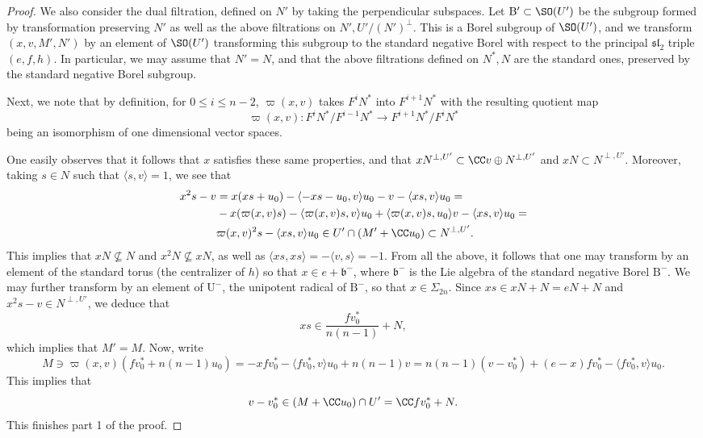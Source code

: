 \documentclass[11pt]{article}
\begin{document}
\begin{proof}
    We also consider the dual filtration, defined on $N'$ by taking the perpendicular subspaces.
    Let $\mathrm{B}'\subset \SO(U')$ be the subgroup formed by transformation preserving $N'$ as well as the above filtrations on $N', U' / (N')^\perp$. This is a Borel subgroup of $\SO(U')$, and we transform $(x, v, M', N')$ by an element of $\SO(U')$ transforming this subgroup to the standard negative Borel with respect to the principal $\mathfrak{sl}_2$ triple $(e,f,h)$.
    In particular, we may assume that $N' = N$, and that the above filtrations defined on $N^*, N$ are the standard ones, preserved by the standard negative Borel subgroup.

    Next, we note that by definition, for $0\leq i \leq n-2$, $\varpi(x, v)$ takes $F^iN^*$ into $F^{i+1}N^*$ with the resulting quotient map $$\varpi(x,v): F^iN^*/F^{i-1}N^*\to F^{i+1}N^*/F^iN^*$$ being an isomorphism of one dimensional vector spaces.
    
    One easily observes that it follows that $x$ satisfies these same properties, and that $xN^{\perp, U'}\subset \CC v \oplus N^{\perp, U'}$ and $x N \subset N^{\perp, U'}$.
    Moreover, taking $s\in N$ such that $\langle s, v\rangle = 1$, we see that
    $$\begin{aligned}
        x^2s-v &= x(xs+u_0) - \langle -xs-u_0, v \rangle u_0 - v - \langle xs, v \rangle u_0 =\\& -x(\varpi(x,v)s) - \langle \varpi(x,v)s, v \rangle u_0 + \langle \varpi(x,v)s, u_0 \rangle v - \langle xs, v \rangle u_0 =\\& \varpi(x, v)^2s - \langle xs, v \rangle u_0\in U'\cap(M'+\CC u_0)\subset N^{\perp, U'}.
    \end{aligned}$$
    This implies that $xN\nsubseteq N$ and $x^2N\nsubseteq xN$, as well as $\langle xs, xs\rangle = -\langle v, s \rangle = -1$.
    From all the above, it follows that one may transform by an element of the standard torus (the centralizer of $h$) so that $x\in e + \mathfrak{b}^-$, where $\mathfrak{b}^-$ is the Lie algebra of the standard negative Borel $\mathrm{B}^-$.
    We may further transform by an element of $\mathrm{U}^-$, the unipotent radical of $\mathrm{B}^-$, so that $x\in \Sigma_{2n}$.
    Since $xs\in xN+N = eN+N$ and $x^2s-v\in N^{\perp, U'}$, we deduce that $$xs \in \frac{fv_0^*}{n(n-1)} + N,$$
    which implies that $M'=M$.
    Now, write
    $$M\ni \varpi(x, v) (fv_0^* + n(n-1)u_0) = -xfv_0^* -\langle fv_0^*, v\rangle u_0 + n(n-1)v = n(n-1)(v-v_0^*) +(e-x)fv_0^* -\langle fv_0^*, v\rangle u_0.$$
    This implies that
    $$v-v_0^*\in (M + \CC u_0)\cap U' = \CC fv_0^* + N.$$
    This finishes part 1 of the proof.


\end{proof}
\end{document}
